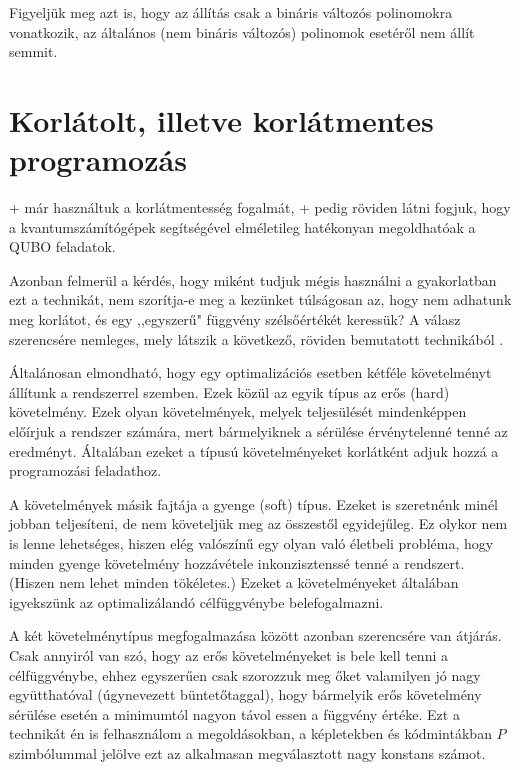 Figyeljük meg azt is, hogy az állítás csak a bináris változós polinomokra vonatkozik, az általános (nem bináris változós) polinomok esetéről nem állít semmit.


\section{Korlátolt, illetve korlátmentes programozás} \label{sec:constrainedVSunconstrained}

\Az+ már használtuk a korlátmentesség fogalmát, \az+ pedig röviden látni fogjuk, hogy a kvantumszámítógépek segítségével elméletileg hatékonyan megoldhatóak a QUBO feladatok.

Azonban felmerül a kérdés, hogy miként tudjuk mégis használni a gyakorlatban ezt a technikát, nem szorítja-e meg a kezünket túlságosan az, hogy nem adhatunk meg korlátot, és egy ,,egyszerű" függvény szélsőértékét keressük? A válasz szerencsére nemleges, mely látszik a következő, röviden bemutatott technikából \cite{DBLP:journals/corr/abs-1811-11538}. 

Általánosan elmondható, hogy egy optimalizációs esetben kétféle követelményt állítunk a rendszerrel szemben. Ezek közül az egyik típus az erős (hard) követelmény. Ezek olyan követelmények, melyek teljesülését mindenképpen előírjuk a rendszer számára, mert bármelyiknek a sérülése érvénytelenné tenné az eredményt. Általában ezeket a típusú követelményeket korlátként adjuk hozzá a programozási feladathoz.

A követelmények másik fajtája a gyenge (soft) típus. Ezeket is szeretnénk minél jobban teljesíteni, de nem követeljük meg az összestől egyidejűleg. Ez olykor nem is lenne lehetséges, hiszen elég valószínű egy olyan való életbeli probléma, hogy minden gyenge követelmény hozzávétele inkonzisztenssé tenné a rendszert. (Hiszen nem lehet minden tökéletes.) Ezeket a követelményeket általában igyekszünk az optimalizálandó célfüggvénybe belefogalmazni.

A két követelménytípus megfogalmazása között azonban szerencsére van átjárás. Csak annyiról van szó, hogy az erős követelményeket is bele kell tenni a célfüggvénybe, ehhez egyszerűen csak szorozzuk meg őket valamilyen jó nagy együtthatóval (úgynevezett büntetőtaggal), hogy bármelyik erős követelmény sérülése esetén a minimumtól nagyon távol essen a függvény értéke.
Ezt a technikát én is felhasználom a megoldásokban, a képletekben és kódmintákban $P$ szimbólummal jelölve ezt az alkalmasan megválasztott nagy konstans számot.

